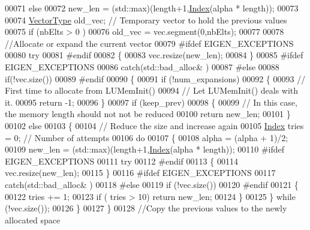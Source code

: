 \begin{DoxyCode}
00071   \textcolor{keywordflow}{else} 
00072     new\_len = (std::max)(length+1,\hyperlink{namespace_eigen_a62e77e0933482dafde8fe197d9a2cfde}{Index}(alpha * length));
00073   
00074   \hyperlink{struct_vector_type}{VectorType} old\_vec; \textcolor{comment}{// Temporary vector to hold the previous values   }
00075   \textcolor{keywordflow}{if} (nbElts > 0 )
00076     old\_vec = vec.segment(0,nbElts); 
00077   
00078   \textcolor{comment}{//Allocate or expand the current vector}
00079 \textcolor{preprocessor}{#ifdef EIGEN\_EXCEPTIONS}
00080   \textcolor{keywordflow}{try}
00081 \textcolor{preprocessor}{#endif}
00082   \{
00083     vec.resize(new\_len); 
00084   \}
00085 \textcolor{preprocessor}{#ifdef EIGEN\_EXCEPTIONS}
00086   \textcolor{keywordflow}{catch}(std::bad\_alloc& )
00087 \textcolor{preprocessor}{#else}
00088   \textcolor{keywordflow}{if}(!vec.size())
00089 #endif
00090   \{
00091     \textcolor{keywordflow}{if} (!num\_expansions)
00092     \{
00093       \textcolor{comment}{// First time to allocate from LUMemInit()}
00094       \textcolor{comment}{// Let LUMemInit() deals with it.}
00095       \textcolor{keywordflow}{return} -1;
00096     \}
00097     \textcolor{keywordflow}{if} (keep\_prev)
00098     \{
00099       \textcolor{comment}{// In this case, the memory length should not not be reduced}
00100       \textcolor{keywordflow}{return} new\_len;
00101     \}
00102     \textcolor{keywordflow}{else} 
00103     \{
00104       \textcolor{comment}{// Reduce the size and increase again }
00105       \hyperlink{namespace_eigen_a62e77e0933482dafde8fe197d9a2cfde}{Index} tries = 0; \textcolor{comment}{// Number of attempts}
00106       \textcolor{keywordflow}{do} 
00107       \{
00108         alpha = (alpha + 1)/2;
00109         new\_len = (std::max)(length+1,\hyperlink{namespace_eigen_a62e77e0933482dafde8fe197d9a2cfde}{Index}(alpha * length));
00110 \textcolor{preprocessor}{#ifdef EIGEN\_EXCEPTIONS}
00111         \textcolor{keywordflow}{try}
00112 \textcolor{preprocessor}{#endif}
00113         \{
00114           vec.resize(new\_len); 
00115         \}
00116 \textcolor{preprocessor}{#ifdef EIGEN\_EXCEPTIONS}
00117         \textcolor{keywordflow}{catch}(std::bad\_alloc& )
00118 \textcolor{preprocessor}{#else}
00119         \textcolor{keywordflow}{if} (!vec.size())
00120 #endif
00121         \{
00122           tries += 1; 
00123           \textcolor{keywordflow}{if} ( tries > 10) \textcolor{keywordflow}{return} new\_len; 
00124         \}
00125       \} \textcolor{keywordflow}{while} (!vec.size());
00126     \}
00127   \}
00128   \textcolor{comment}{//Copy the previous values to the newly allocated space }

\end{DoxyCode}
